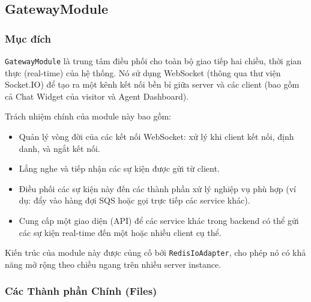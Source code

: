 \subsection{GatewayModule}
\label{subsec:gateway-module}

\subsubsection{Mục đích}

\texttt{GatewayModule} là trung tâm điều phối cho toàn bộ giao tiếp hai chiều, thời gian thực (real-time) của hệ thống. Nó sử dụng WebSocket (thông qua thư viện Socket.IO) để tạo ra một kênh kết nối bền bỉ giữa server và các client (bao gồm cả Chat Widget của visitor và Agent Dashboard).

Trách nhiệm chính của module này bao gồm:
\begin{itemize}
    \item Quản lý vòng đời của các kết nối WebSocket: xử lý khi client kết nối, định danh, và ngắt kết nối.
    \item Lắng nghe và tiếp nhận các sự kiện được gửi từ client.
    \item Điều phối các sự kiện này đến các thành phần xử lý nghiệp vụ phù hợp (ví dụ: đẩy vào hàng đợi SQS hoặc gọi trực tiếp các service khác).
    \item Cung cấp một giao diện (API) để các service khác trong backend có thể gửi các sự kiện real-time đến một hoặc nhiều client cụ thể.
\end{itemize}
Kiến trúc của module này được củng cố bởi \texttt{RedisIoAdapter}, cho phép nó có khả năng mở rộng theo chiều ngang trên nhiều server instance.

\subsubsection{Các Thành phần Chính (Files)}


